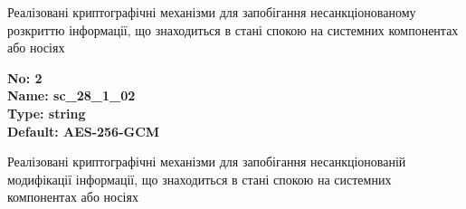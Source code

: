 \documentclass{article}
\begin{document}
{\footnotesize Реалізовані криптографічні механізми для запобігання несанкціонованому розкриттю інформації, що знаходиться в стані спокою на системних компонентах або носіях}


{\footnotesize\bfseries
No: 2\\
Name: sc\_\allowbreak{}28\_\allowbreak{}1\_\allowbreak{}02\\
Type: string\\
Default: \textquotedbl{}AES-256-GCM\textquotedbl{}
}

{\footnotesize Реалізовані криптографічні механізми для запобігання несанкціонованій модифікації інформації, що знаходиться в стані спокою на системних компонентах або носіях}
\end{document}
